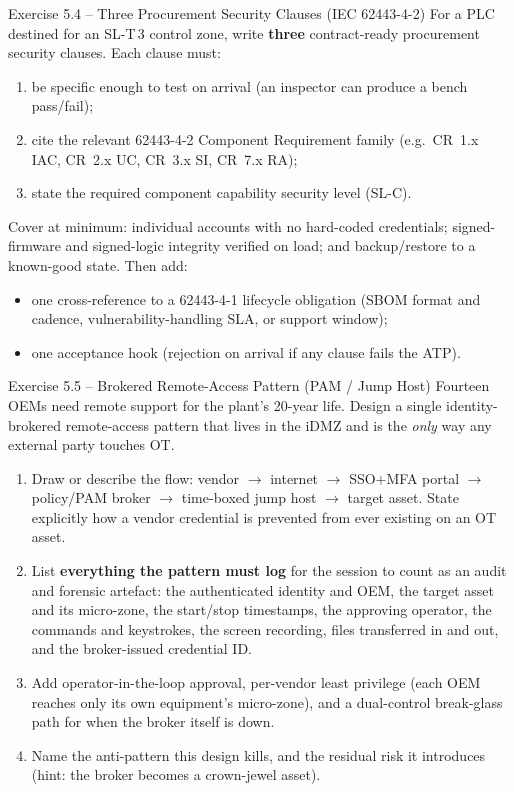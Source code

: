 \documentclass[11pt,a4paper]{article}
\begin{document}
\begin{taskbox}{Exercise 5.4 -- Three Procurement Security Clauses (IEC 62443-4-2)}
For a PLC destined for an SL-T\,3 control zone, write \textbf{three} contract-ready procurement security clauses. Each clause must:
\begin{enumerate}
  \item be specific enough to test on arrival (an inspector can produce a bench pass/fail);
  \item cite the relevant 62443-4-2 Component Requirement family (e.g.\ CR~1.x IAC, CR~2.x UC, CR~3.x SI, CR~7.x RA);
  \item state the required component capability security level (SL-C).
\end{enumerate}
Cover at minimum: individual accounts with no hard-coded credentials; signed-firmware and signed-logic integrity verified on load; and backup/restore to a known-good state. Then add:
\begin{itemize}\setlength{\itemsep}{1pt}
  \item one cross-reference to a 62443-4-1 lifecycle obligation (SBOM format and cadence, vulnerability-handling SLA, or support window);
  \item one acceptance hook (rejection on arrival if any clause fails the ATP).
\end{itemize}
\end{taskbox}

\begin{taskbox}{Exercise 5.5 -- Brokered Remote-Access Pattern (PAM / Jump Host)}
Fourteen OEMs need remote support for the plant's 20-year life. Design a single identity-brokered remote-access pattern that lives in the iDMZ and is the \emph{only} way any external party touches OT.
\begin{enumerate}
  \item Draw or describe the flow: vendor $\to$ internet $\to$ SSO+MFA portal $\to$ policy/PAM broker $\to$ time-boxed jump host $\to$ target asset. State explicitly how a vendor credential is prevented from ever existing on an OT asset.
  \item List \textbf{everything the pattern must log} for the session to count as an audit and forensic artefact: the authenticated identity and OEM, the target asset and its micro-zone, the start/stop timestamps, the approving operator, the commands and keystrokes, the screen recording, files transferred in and out, and the broker-issued credential ID.
  \item Add operator-in-the-loop approval, per-vendor least privilege (each OEM reaches only its own equipment's micro-zone), and a dual-control break-glass path for when the broker itself is down.
  \item Name the anti-pattern this design kills, and the residual risk it introduces (hint: the broker becomes a crown-jewel asset).
\end{enumerate}
\end{taskbox}
\end{document}
